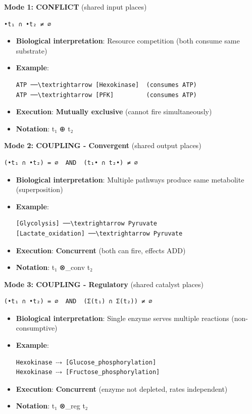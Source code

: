 \textbf{Mode 1: CONFLICT} (shared input places)

\begin{lstlisting}
•t₁ ∩ •t₂ ≠ ∅
\end{lstlisting}

\begin{itemize}
\item
  \textbf{Biological interpretation}: Resource competition (both consume
  same substrate)
\item
  \textbf{Example}:

\begin{lstlisting}
ATP ──\textrightarrow [Hexokinase]  (consumes ATP)
ATP ──\textrightarrow [PFK]         (consumes ATP)
\end{lstlisting}
\item
  \textbf{Execution}: \textbf{Mutually exclusive} (cannot fire
  simultaneously)
\item
  \textbf{Notation}: t₁ ⊕ t₂
\end{itemize}

\textbf{Mode 2: COUPLING - Convergent} (shared output places)

\begin{lstlisting}
(•t₁ ∩ •t₂) = ∅  AND  (t₁• ∩ t₂•) ≠ ∅
\end{lstlisting}

\begin{itemize}
\item
  \textbf{Biological interpretation}: Multiple pathways produce same
  metabolite (superposition)
\item
  \textbf{Example}:

\begin{lstlisting}
[Glycolysis] ──\textrightarrow Pyruvate
[Lactate_oxidation] ──\textrightarrow Pyruvate
\end{lstlisting}
\item
  \textbf{Execution}: \textbf{Concurrent} (both can fire, effects ADD)
\item
  \textbf{Notation}: t₁ ⊗\_conv t₂
\end{itemize}

\textbf{Mode 3: COUPLING - Regulatory} (shared catalyst places)

\begin{lstlisting}
(•t₁ ∩ •t₂) = ∅  AND  (Σ(t₁) ∩ Σ(t₂)) ≠ ∅
\end{lstlisting}

\begin{itemize}
\item
  \textbf{Biological interpretation}: Single enzyme serves multiple
  reactions (non-consumptive)
\item
  \textbf{Example}:

\begin{lstlisting}
Hexokinase ⤏ [Glucose_phosphorylation]
Hexokinase ⤏ [Fructose_phosphorylation]
\end{lstlisting}
\item
  \textbf{Execution}: \textbf{Concurrent} (enzyme not depleted, rates
  independent)
\item
  \textbf{Notation}: t₁ ⊗\_reg t₂
\end{itemize}

